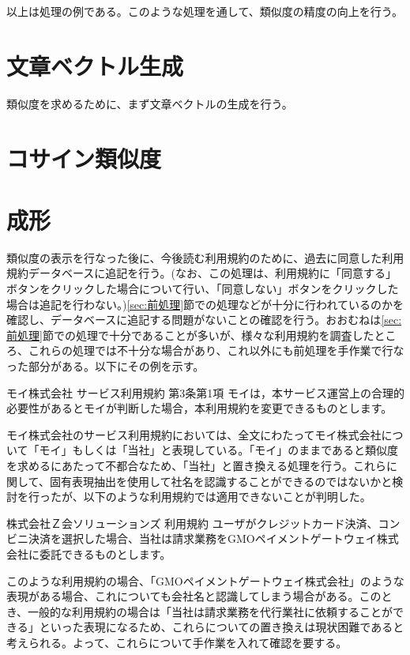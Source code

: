 以上は処理の例である。このような処理を通して、類似度の精度の向上を行う。

\section{文章ベクトル生成}
類似度を求めるために、まず文章ベクトルの生成を行う。

\section{コサイン類似度}

\section{成形}
類似度の表示を行なった後に、今後読む利用規約のために、過去に同意した利用規約データベースに追記を行う。(なお、この処理は、利用規約に「同意する」ボタンをクリックした場合について行い、「同意しない」ボタンをクリックした場合は追記を行わない。)\ref{sec:前処理}節での処理などが十分に行われているのかを確認し、データベースに追記する問題がないことの確認を行う。おおむねは\ref{sec:前処理}節での処理で十分であることが多いが、様々な利用規約を調査したところ、これらの処理では不十分な場合があり、これ以外にも前処理を手作業で行なった部分がある。以下にその例を示す。

\begin{itembox}[l]{モイ株式会社 サービス利用規約 第3条第1項}
  モイは，本サービス運営上の合理的必要性があるとモイが判断した場合，本利用規約を変更できるものとします。
\end{itembox}  

モイ株式会社のサービス利用規約においては、全文にわたってモイ株式会社について「モイ」もしくは「当社」と表現している。「モイ」のままであると類似度を求めるにあたって不都合なため、「当社」と置き換える処理を行う。これらに関して、固有表現抽出を使用して社名を認識することができるのではないかと検討を行ったが、以下のような利用規約では適用できないことが判明した。

\begin{itembox}[l]{株式会社Ｚ会ソリューションズ 利用規約}
  ユーザがクレジットカード決済、コンビニ決済を選択した場合、当社は請求業務をGMOペイメントゲートウェイ株式会社に委託できるものとします。
\end{itembox}

このような利用規約の場合、「GMOペイメントゲートウェイ株式会社」のような表現がある場合、これについても会社名と認識してしまう場合がある。このとき、一般的な利用規約の場合は「当社は請求業務を代行業社に依頼することができる」といった表現になるため、これらについての置き換えは現状困難であると考えられる。よって、これらについて手作業を入れて確認を要する。

